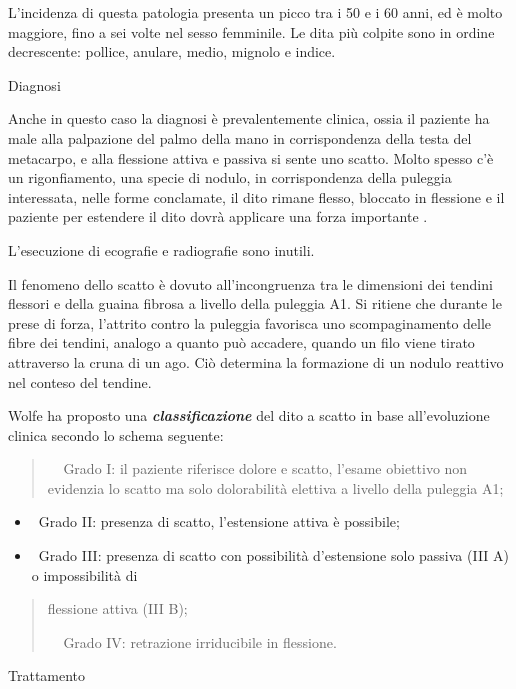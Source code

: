 \documentclass[]{article}
\begin{document}
L'incidenza di questa patologia presenta un picco tra i 50 e i 60 anni,
ed è molto maggiore, fino a sei volte nel sesso femminile. Le dita più
colpite sono in ordine decrescente: pollice, anulare, medio, mignolo e
indice.

Diagnosi

Anche in questo caso la diagnosi è prevalentemente clinica, ossia il
paziente ha male alla palpazione del palmo della mano in corrispondenza
della testa del metacarpo, e alla flessione attiva e passiva si sente
uno scatto. Molto spesso c'è un rigonfiamento, una specie di nodulo, in
corrispondenza della puleggia interessata, nelle forme conclamate, il
dito rimane flesso, bloccato in flessione e il paziente per estendere il
dito dovrà applicare una forza importante .

L'esecuzione di ecografie e radiografie sono inutili.

Il fenomeno dello scatto è dovuto all'incongruenza tra le dimensioni dei
tendini flessori e della guaina fibrosa a livello della puleggia A1. Si
ritiene che durante le prese di forza, l'attrito contro la puleggia
favorisca uno scompaginamento delle fibre dei tendini, analogo a quanto
può accadere, quando un filo viene tirato attraverso la cruna di un ago.
Ciò determina la formazione di un nodulo reattivo nel conteso del
tendine.

Wolfe ha proposto una \textbf{\emph{classificazione}} del dito a scatto
in base all'evoluzione clinica secondo lo schema seguente:

\begin{quote}
 ~Grado I: il paziente riferisce dolore e scatto, l'esame obiettivo non
evidenzia lo scatto ma solo dolorabilità elettiva a livello della
puleggia A1;
\end{quote}

\begin{itemize}
\item
  ~Grado II: presenza di scatto, l'estensione attiva è possibile;
\item
  ~Grado III: presenza di scatto con possibilità d'estensione solo
  passiva (III A) o impossibilità di
\end{itemize}

\begin{quote}
flessione attiva (III B);

 ~Grado IV: retrazione irriducibile in flessione.
\end{quote}

Trattamento
\end{document}
